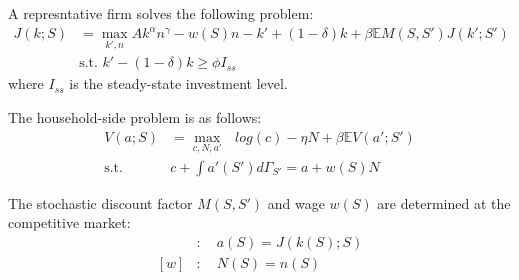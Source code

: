 A represntative firm solves the following problem:
\begin{align*}
  J(k;S) &= \max_{k',n} Ak^{\alpha}n^{\gamma} -w(S)n -k' + (1-\delta)k + \beta\mathbb{E}M(S,S')J(k';S')
  \\
  &\text{s.t. } k' - (1-\delta)k \geq \phi I_{ss}
\end{align*}
where $I_{ss}$ is the steady-state investment level.

The household-side problem is as follows:
\begin{align*}
  V(a;S) &= \max_{c,N,a'}\text{ } log(c) - \eta N + \beta \mathbb{E}V(a';S')
  \\
  \text{s.t.}\quad& c + \int a'(S') d\Gamma_{S'} =  a + w(S)N
\end{align*}

The stochastic discount factor $M(S,S')$ and wage $w(S)$ are determined at the competitive market:
\begin{align*}
  [M]&:\quad a(S) = J(k(S);S)
  \\
  [w]&:\quad N(S) = n(S)
\end{align*}

